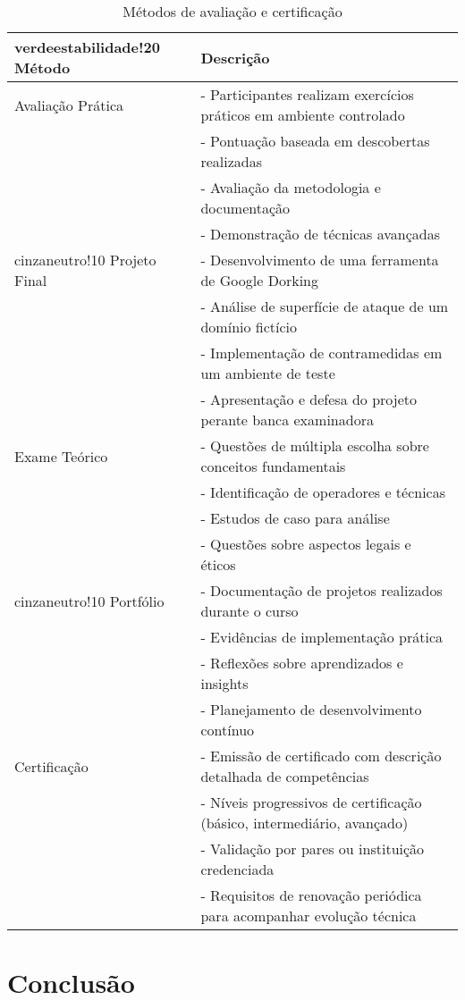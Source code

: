 \documentclass[12pt,a4paper]{book}
\begin{document}
\begin{table}[h]
\centering
\begin{tabular}{|p{4cm}|p{11cm}|}
\hline
{verdeestabilidade!20} \textbf{Método} & \textbf{Descrição} \\
\hline
Avaliação Prática & - Participantes realizam exercícios práticos em ambiente controlado \\
& - Pontuação baseada em descobertas realizadas \\
& - Avaliação da metodologia e documentação \\
& - Demonstração de técnicas avançadas \\
\hline
{cinzaneutro!10} Projeto Final & - Desenvolvimento de uma ferramenta de Google Dorking \\
& - Análise de superfície de ataque de um domínio fictício \\
& - Implementação de contramedidas em um ambiente de teste \\
& - Apresentação e defesa do projeto perante banca examinadora \\
\hline
Exame Teórico & - Questões de múltipla escolha sobre conceitos fundamentais \\
& - Identificação de operadores e técnicas \\
& - Estudos de caso para análise \\
& - Questões sobre aspectos legais e éticos \\
\hline
{cinzaneutro!10} Portfólio & - Documentação de projetos realizados durante o curso \\
& - Evidências de implementação prática \\
& - Reflexões sobre aprendizados e insights \\
& - Planejamento de desenvolvimento contínuo \\
\hline
Certificação & - Emissão de certificado com descrição detalhada de competências \\
& - Níveis progressivos de certificação (básico, intermediário, avançado) \\
& - Validação por pares ou instituição credenciada \\
& - Requisitos de renovação periódica para acompanhar evolução técnica \\
\hline
\end{tabular}
\caption{Métodos de avaliação e certificação}
\end{table}

\chapter{Conclusão}
\end{document}
